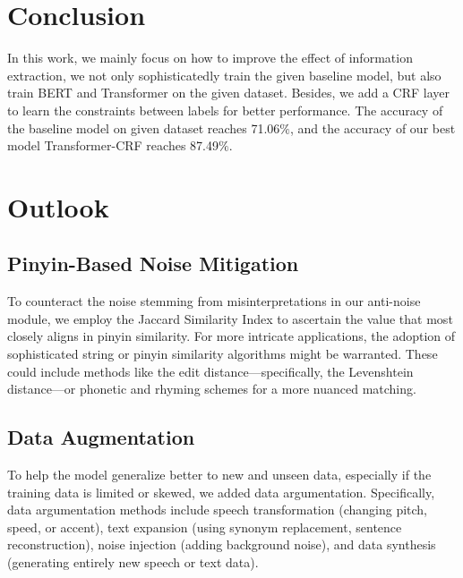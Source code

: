 \documentclass[10pt,twocolumn,letterpaper]{article}
\begin{document}
\section{Conclusion}
In this work, we mainly focus on how to improve the effect of information extraction, we not only sophisticatedly train the given baseline model, but also train BERT and Transformer on the given dataset. Besides, we add a CRF layer to learn the constraints between labels for better performance. The accuracy of the baseline model on given dataset reaches 71.06$\%$, and the accuracy of our best model Transformer-CRF reaches 87.49$\%$.


\section{Outlook}
\subsection{Pinyin-Based Noise Mitigation}

To counteract the noise stemming from misinterpretations in our anti-noise module, we employ the Jaccard Similarity Index to ascertain the value that most closely aligns in pinyin similarity. For more intricate applications, the adoption of sophisticated string or pinyin similarity algorithms might be warranted. These could include methods like the edit distance—specifically, the Levenshtein distance—or phonetic and rhyming schemes for a more nuanced matching.
\subsection{Data Augmentation}

To help the model generalize better to new and unseen data, especially if the training data is limited or skewed, we added data argumentation. Specifically, data argumentation methods include speech transformation (changing pitch, speed, or accent), text expansion (using synonym replacement, sentence reconstruction), noise injection (adding background noise), and data synthesis (generating entirely new speech or text data).

{\small


}

 
\end{document}
